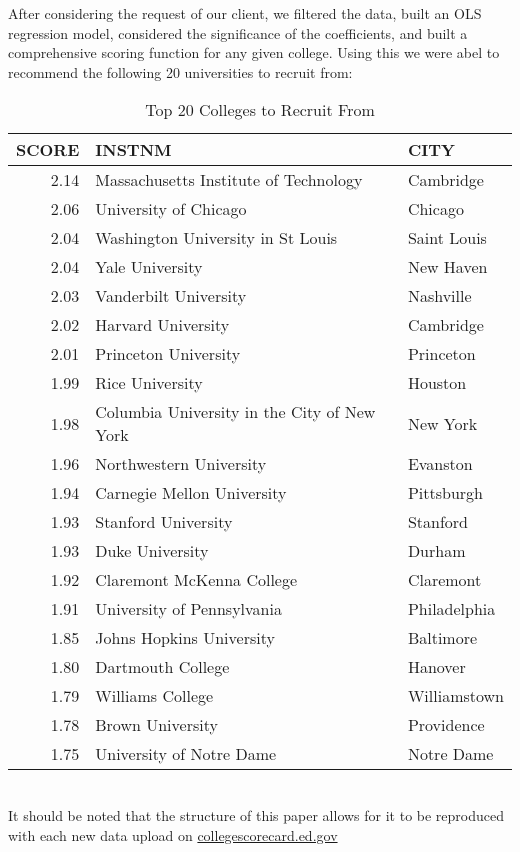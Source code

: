 \documentclass[11pt,english]{article}
\begin{document}
After considering the request of our client, we filtered the data, built an OLS regression model, considered the significance of the coefficients, and built a comprehensive scoring function for any given college. Using this we were abel to recommend the following 20 universities to recruit from:
\begin{table}[ht]
\centering
\begin{tabular}{rll}
  \hline
SCORE & INSTNM & CITY \\ 
  \hline
2.14 & Massachusetts Institute of Technology & Cambridge \\ 
  2.06 & University of Chicago & Chicago \\ 
  2.04 & Washington University in St Louis & Saint Louis \\ 
  2.04 & Yale University & New Haven \\ 
  2.03 & Vanderbilt University & Nashville \\ 
  2.02 & Harvard University & Cambridge \\ 
  2.01 & Princeton University & Princeton \\ 
  1.99 & Rice University & Houston \\ 
  1.98 & Columbia University in the City of New York & New York \\ 
  1.96 & Northwestern University & Evanston \\ 
  1.94 & Carnegie Mellon University & Pittsburgh \\ 
  1.93 & Stanford University & Stanford \\ 
  1.93 & Duke University & Durham \\ 
  1.92 & Claremont McKenna College & Claremont \\ 
  1.91 & University of Pennsylvania & Philadelphia \\ 
  1.85 & Johns Hopkins University & Baltimore \\ 
  1.80 & Dartmouth College & Hanover \\ 
  1.79 & Williams College & Williamstown \\ 
  1.78 & Brown University & Providence \\ 
  1.75 & University of Notre Dame & Notre Dame \\ 
   \hline
\end{tabular}
\caption{Top 20 Colleges to Recruit From} 
\end{table}\\
It should be noted that the structure of this paper allows for it to be reproduced with each new data upload on \href{https://collegescorecard.ed.gov/data}{collegescorecard.ed.gov}
\end{document}
